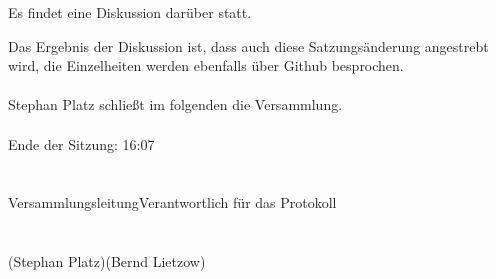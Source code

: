 \documentclass{scrartcl}
\begin{document}
Es findet eine Diskussion darüber statt.

Das Ergebnis der Diskussion ist, dass auch diese Satzungsänderung angestrebt wird, die Einzelheiten werden ebenfalls über Github besprochen.
\\
\\
    Stephan Platz schließt im folgenden die Versammlung.\\
\\
    Ende der Sitzung: 16:07
\section*{}

Versammlungsleitung\hspace{5cm}Verantwortlich für das Protokoll\\
\\
\\
(Stephan Platz)\hspace{5.9cm}(Bernd Lietzow)
\\
\\
\end{document}
